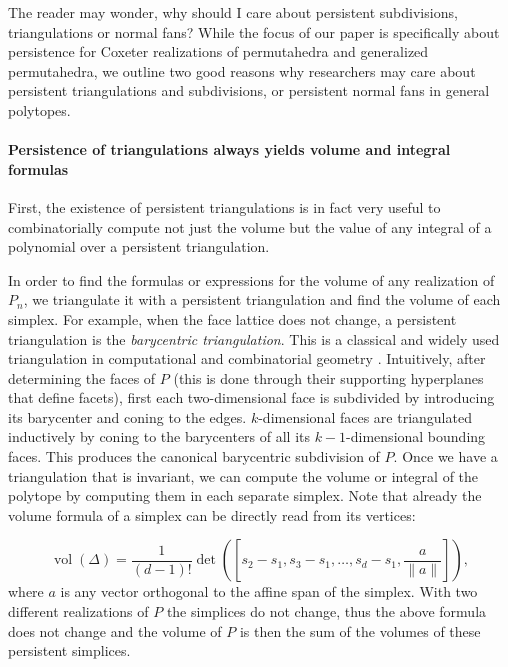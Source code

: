 \documentclass{amsart}
\theoremstyle{definition}
\begin{document}
The reader may wonder, why should I care about persistent subdivisions, triangulations or normal fans? While the focus of our paper is specifically about persistence for Coxeter realizations of permutahedra and generalized permutahedra, we outline two good reasons why researchers may care about persistent triangulations and subdivisions, or persistent normal fans in general polytopes.


\paragraph{\bf Persistence of triangulations always yields volume and integral formulas} First, the existence of persistent triangulations is in fact very useful to combinatorially compute not just the volume but the value of any integral of a polynomial over a persistent triangulation.

In order to find the formulas or expressions for the volume of any realization of $P_n$, we triangulate it with a persistent triangulation and find the volume of 
each simplex. For example, when the face lattice does not change, a persistent triangulation is the \emph{barycentric triangulation}. This is a classical and widely used triangulation in computational and combinatorial geometry \cite{DLRS10}. Intuitively, after determining the faces of $P$ (this is done through their supporting hyperplanes that define facets), first each two-dimensional face is subdivided by introducing its barycenter and coning to the edges. $k$-dimensional faces are triangulated inductively by coning to the barycenters of all its $k-1$-dimensional bounding faces. This produces the canonical barycentric subdivision of $P$. Once we have a triangulation that is invariant, we can compute the volume or integral of the polytope by computing them in each separate simplex. Note that already the volume formula of a simplex can be directly read from its vertices:

\begin{equation}
    \operatorname{vol}(\Delta)
    =
    \frac{1}{(d-1)!}
    \det \left(\left[ s_2 - s_1, s_3 - s_1, \dots, s_{d} - s_1, \frac{a}{\|a\|}\right]\right),
    \label{eqn:determinant_slice}
\end{equation}
where $a$ is any vector orthogonal to the affine span of the simplex. With two different realizations of $P$ the simplices do not change, thus the above formula does not change and the volume of $P$ is then the sum of the volumes of these persistent simplices.
\end{document}
